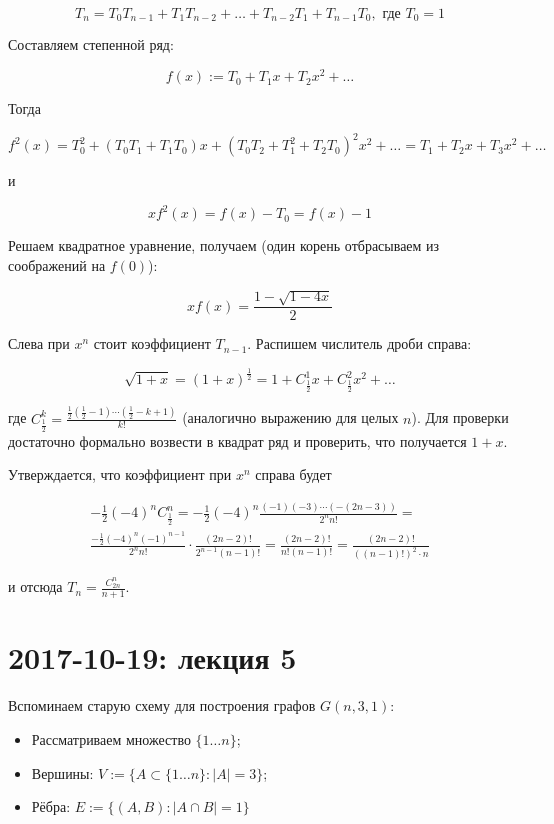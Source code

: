 \documentclass[12pt]{article}
\begin{document}
\[
T_n = T_0 T_{n - 1} + T_1 T_{n - 2} + \ldots + T_{n - 2} T_1 + T_{n - 1} T_0, \text{ где } T_0 = 1
\]

Составляем степенной ряд:

\[
f(x) := T_0 + T_1 x + T_2 x^2 + \ldots
\]

Тогда

\[
f^2(x) = T_0^2 + (T_0 T_1 + T_1 T_0) x + (T_0 T_2 + T_1^2 + T_2 T_0)^2 x^2 + \ldots = T_1 + T_2 x + T_3 x^2 + \ldots
\]

и

\[
x f^2(x) = f(x) - T_0 = f(x) - 1
\]

Решаем квадратное уравнение, получаем (один корень отбрасываем из соображений на $f(0)$):

\[
x f(x) = \frac {1 - \sqrt{1 - 4x}} 2
\]

Слева при $x^n$ стоит коэффициент $T_{n - 1}$. Распишем числитель дроби справа:

\[
\sqrt{1 + x} = (1 + x)^{\frac 1 2} = 1 + C^1_{\frac 1 2} x + C^2_{\frac 1 2} x^2 + \ldots
\]

где $C^k_{\frac 1 2} = \frac {\frac 1 2 \left( \frac 1 2 - 1 \right) \cdots \left( \frac 1 2 - k + 1 \right)} {k!}$ (аналогично выражению для целых $n$). Для проверки достаточно формально возвести в квадрат ряд и проверить, что получается $1 + x$.

Утверждается, что коэффициент при $x^n$ справа будет

\begin{multline*}
- \frac 1 2 (-4)^n C^n_{\frac 1 2} =
- \frac 1 2 (-4)^n \frac {(-1)(-3) \cdots (-(2n - 3))} {2^n n!} = \\
\frac {- \frac 1 2 (-4)^n (-1)^{n - 1}} {2^n n!} \cdot \frac {(2n - 2)!} {2^{n-1} (n - 1)!} = \frac {(2n - 2)!} {n! (n - 1)!} =
\frac {(2n - 2)!} {((n - 1)!)^2 \cdot n}
\end{multline*}

и отсюда $T_n = \frac {C^n_{2n}} {n + 1}$.

\section{2017-10-19: лекция 5}

Вспоминаем старую схему для построения графов $G(n, 3, 1)$:

\begin{itemize}
\item Рассматриваем множество $\{ 1 \ldots n \}$;
\item Вершины: $V := \{ A \subset \{ 1 \ldots n \} \colon |A| = 3 \}$;
\item Рёбра: $E := \{ (A, B) \colon |A \cap B| = 1 \}$
\end{itemize}
\end{document}
